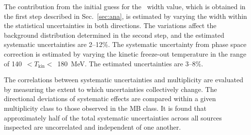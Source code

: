 The contribution from the initial guess for the \fzero~width value, which is obtained in the first step described in Sec.~\ref{sec:ana}, is estimated by varying the width within the statistical uncertainties in both directions. The variations affect the background distribution determined in the second step, and the estimated systematic uncertainties are 2--12\%. The systematic uncertainty from phase space correction is estimated by varying the kinetic freeze-out temperature in the range of 140~$<T_{\mathrm{kin}}<$~180~MeV. The estimated uncertainties are 3--8\%. 

The correlations between systematic uncertainties and multiplicity are evaluated by measuring the extent to which uncertainties collectively change. The directional deviations of systematic effects are compared within a given multiplicity class to those observed in the MB class. It is found that approximately half of the total systematic uncertainties across all sources inspected are uncorrelated and independent of one another.
